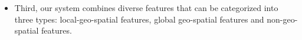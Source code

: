 \begin{itemize}

\item Third, our system combines diverse features that can be categorized 
into three types: local-geo-spatial features, global geo-spatial features
and non-geo-spatial features. 

\end{itemize}
